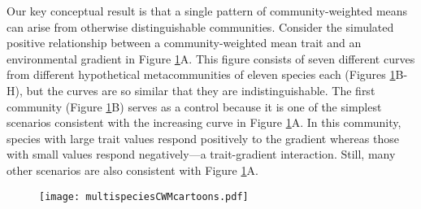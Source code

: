 \documentclass[12pt]{ecology}
\begin{document}

Our key conceptual result is that a single pattern of community-weighted means can arise from otherwise distinguishable communities.  Consider the simulated positive relationship between a community-weighted mean trait and an environmental gradient in Figure \ref{fig:graphicalmodels}A.  This figure consists of seven different curves from different hypothetical metacommunities of eleven species each (Figures \ref{fig:graphicalmodels}B-H), but the curves are so similar that they are indistinguishable.  The first community (Figure \ref{fig:graphicalmodels}B) serves as a control because it is one of the simplest scenarios consistent with the increasing curve in Figure \ref{fig:graphicalmodels}A.  In this community, species with large trait values respond positively to the gradient whereas those with small values respond negatively---a trait-gradient interaction.  Still, many other scenarios are also consistent with Figure \ref{fig:graphicalmodels}A.

\begin{figure}
\caption[The relationships between a community-weighted mean trait and an environmental gradient (A) for seven different metacommunities (B-H).  The lines in (A) are indistinguishable, indicating that information on the differences of the metacommunities is lost by community-weighted averaging.  The lines in B-H correspond to individual species, with trait values indicated by numbers.]{}
\texttt{[image: multispeciesCWMcartoons.pdf]}
\label{fig:graphicalmodels}

\end{figure}
\end{document}

